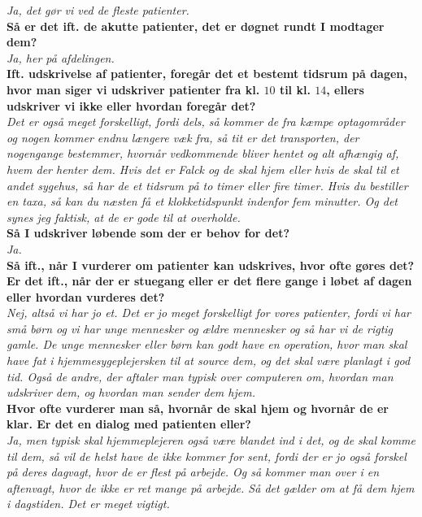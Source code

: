 \noindent
\textit{Ja, det gør vi ved de fleste patienter.}\\
\noindent
\textbf{Så er det ift. de akutte patienter, det er døgnet rundt I modtager dem?}\\
\noindent
\textit{Ja, her på afdelingen.}\\
\noindent
\textbf{Ift. udskrivelse af patienter, foregår det et bestemt tidsrum på dagen, hvor man siger vi udskriver patienter fra kl. $10$ til kl. $14$, ellers udskriver vi ikke eller hvordan foregår det?}\\
\noindent
\textit{Det er også meget forskelligt, fordi dels, så kommer de fra kæmpe optagområder og nogen kommer endnu længere væk fra, så tit er det transporten, der nogengange bestemmer, hvornår vedkommende bliver hentet og alt afhængig af, hvem der henter dem. Hvis det er Falck og de skal hjem eller hvis de skal til et andet sygehus, så har de et tidsrum på to timer eller fire timer. Hvis du bestiller en taxa, så kan du næsten få et klokketidspunkt indenfor fem minutter. Og det synes jeg faktisk, at de er gode til at overholde.}\\ 
\noindent
\textbf{Så I udskriver løbende som der er behov for det?}\\
\noindent
\textit{Ja.}\\
\noindent
\textbf{Så ift., når I vurderer om patienter kan udskrives, hvor ofte gøres det? Er det ift., når der er stuegang eller er det flere gange i løbet af dagen eller hvordan vurderes det?}\\
\noindent
\textit{Nej, altså vi har jo et. Det er jo meget forskelligt for vores patienter, fordi vi har små børn og vi har unge mennesker og ældre mennesker og så har vi de rigtig gamle. De unge mennesker eller børn kan godt have en operation, hvor man skal have fat i hjemmesygeplejersken til at source dem, og det skal være planlagt i god tid. Også de andre, der aftaler man typisk over computeren om, hvordan man udskriver dem, og hvordan man sender dem hjem.}\\
\noindent
\textbf{Hvor ofte vurderer man så, hvornår de skal hjem og hvornår de er klar. Er det en dialog med patienten eller?}\\
\noindent
\textit{Ja, men typisk skal hjemmeplejeren også være blandet ind i det, og de skal komme til dem, så vil de helst have de ikke kommer for sent, fordi der er jo også forskel på deres dagvagt, hvor de er flest på arbejde. Og så kommer man over i en aftenvagt, hvor de ikke er ret mange på arbejde. Så det gælder om at få dem hjem i dagstiden. Det er meget vigtigt.}\\
